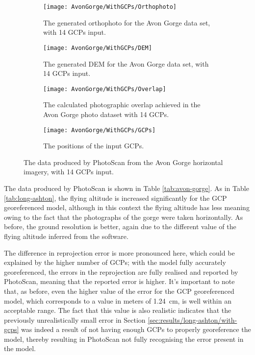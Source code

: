 \begin{figure}
    \centering
    \begin{subfigure}[b]{0.45\textwidth}
        \texttt{[image: AvonGorge/WithGCPs/Orthophoto]}
        \caption{The generated orthophoto for the Avon Gorge data set, with 14
        GCPs input.}
        \label{img:avon-gorge/with-gcps/orthophoto}
    \end{subfigure}
    \begin{subfigure}[b]{0.45\textwidth}
        \texttt{[image: AvonGorge/WithGCPs/DEM]}
        \caption{The generated DEM for the Avon Gorge data set, with 14 GCPs
        input.}
        \label{img:avon-gorge/with-gcps/dem}
    \end{subfigure}
    \begin{subfigure}[b]{0.45\textwidth}
        \texttt{[image: AvonGorge/WithGCPs/Overlap]}
        \caption{The calculated photographic overlap achieved in the Avon Gorge
        photo dataset with 14 GCPs.}
        \label{img:avon-gorge/with-gcps/overlap}
    \end{subfigure}
    \begin{subfigure}[b]{0.45\textwidth}
        \texttt{[image: AvonGorge/WithGCPs/GCPs]}
        \caption{The positions of the input GCPs.}
        \label{img:avon-gorge/with-gcps/gcps}
    \end{subfigure}
    \caption{The data produced by PhotoScan from the Avon Gorge horizontal
    imagery, with 14 GCPs input.}
    \label{img:avon-gorge/with-gcps}
\end{figure}

The data produced by PhotoScan is shown in Table \ref{tab:avon-gorge}. As in
Table \ref{tab:long-ashton}, the flying altitude is increased significantly for
the GCP georeferenced model, although in this context the flying altitude has
less meaning owing to the fact that the photographs of the gorge were taken
horizontally. As before, the ground resolution is better, again due to the
different value of the flying altitude inferred from the software.

The difference in reprojection error is more pronounced here, which could be
explained by the higher number of GCPs; with the model fully accurately
georeferenced, the errors in the reprojection are fully realised and reported by
PhotoScan, meaning that the reported error is higher. It's important to note
that, as before, even the higher value of the error for the GCP georeferenced
model, which corresponds to a value in meters of \SI{1.24}{cm}, is well within
an acceptable range. The fact that this value is also realistic indicates that
the previously unrealistically small error in Section
\ref{sec:results/long-ashton/with-gcps} was indeed a result of not having enough
GCPs to properly georeference the model, thereby resulting in PhotoScan not
fully recognising the error present in the model.

